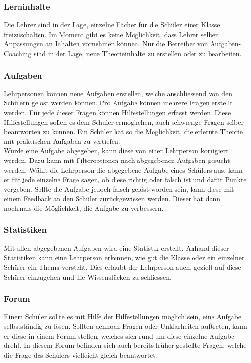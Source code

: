 \subsubsection*{Lerninhalte}
Die Lehrer sind in der Lage, einzelne Fächer für die Schüler einer Klasse freizuschalten. Im Moment gibt es keine Möglichkeit, dass Lehrer selber Anpassungen an Inhalten vornehmen können. Nur die Betreiber von Aufgaben-Coaching sind in der Lage, neue Theorieinhalte zu erstellen oder zu bearbeiten.

\subsubsection*{Aufgaben}
Lehrpersonen können neue Aufgaben erstellen, welche anschliessend von den Schülern gelöst werden können. Pro Aufgabe können mehrere Fragen erstellt werden. Für jede dieser Fragen können Hilfestellungen erfasst werden. Diese Hilfestellungen sollen es dem Schüler ermöglichen, auch schwierige Fragen selber beantworten zu können. Ein Schüler hat so die Möglichkeit, die erlernte Theorie mit praktischen Aufgaben zu vertiefen. \\

Wurde eine Aufgabe abgegeben, kann diese von einer Lehrperson korrigiert werden. Dazu kann mit Filteroptionen nach abgegebenen Aufgaben gesucht werden. Wählt die Lehrperson die abgegebene Aufgabe eines Schülers aus, kann er für jede einzelne Frage sagen, ob diese richtig oder falsch ist und dafür Punkte vergeben. Sollte die Aufgabe jedoch falsch gelöst worden sein, kann diese mit einem Feedback an den Schüler zurückgewiesen werden. Dieser hat dann nochmals die Möglichkeit, die Aufgabe zu verbessern. 

\subsubsection*{Statistiken}
Mit allen abgegebenen Aufgaben wird eine Statistik erstellt. Anhand dieser Statistiken kann eine Lehrperson erkennen, wie gut die Klasse oder ein einzelner Schüler ein Thema versteht. Dies erlaubt der Lehrperson auch, gezielt auf diese Schüler einzugehen und die Wissenslücken zu schliessen.

\subsubsection*{Forum}
Einem Schüler sollte es mit Hilfe der Hilfestellungen möglich sein, eine Aufgabe selbstständig zu lösen. Sollten dennoch Fragen oder Unklarheiten auftreten, kann er diese in einem Forum stellen, welches sich rund um diese einzelne Aufgabe dreht. In diesem Forum befinden sich auch bereits früher gestellte Fragen, welche die Frage des Schülers vielleicht gleich beantwortet.

